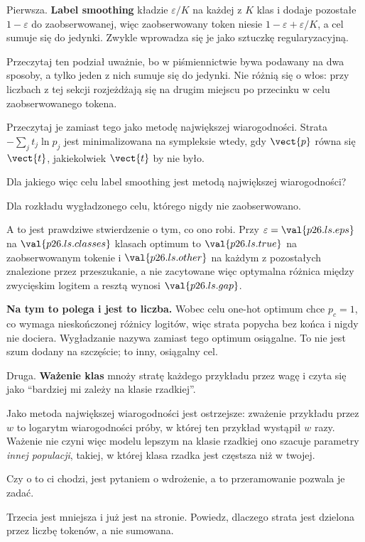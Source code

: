 \begin{fr}
Pierwsza. \textbf{Label smoothing} kładzie $\varepsilon/K$ na każdej z $K$
klas i dodaje pozostałe $1-\varepsilon$ do zaobserwowanej, więc zaobserwowany
token niesie $1 - \varepsilon + \varepsilon/K$, a cel sumuje się do jedynki.
Zwykle wprowadza się je jako sztuczkę regularyzacyjną.

Przeczytaj ten podział uważnie, bo w piśmiennictwie bywa podawany na dwa
sposoby, a tylko jeden z nich sumuje się do jedynki. Nie różnią się o włos:
przy liczbach z tej sekcji rozjeżdżają się na drugim miejscu po przecinku
w celu zaobserwowanego tokena.

Przeczytaj je zamiast tego jako metodę największej wiarogodności. Strata
$-\sum_j t_j \ln p_j$ jest minimalizowana na sympleksie wtedy, gdy $\vect{p}$
równa się $\vect{t}$, jakiekolwiek $\vect{t}$ by nie było.

Dla jakiego więc celu label smoothing jest metodą największej wiarogodności?
\dotline
\nextframe
\end{fr}

\begin{fr}
\begin{ansblock}
Dla rozkładu wygładzonego \dash{} celu, którego nigdy nie zaobserwowano.
\end{ansblock}

A to jest prawdziwe stwierdzenie o tym, co ono robi. Przy
$\varepsilon = \val{p26.ls.eps}$ na $\val{p26.ls.classes}$ klasach optimum to
$\val{p26.ls.true}$ na zaobserwowanym tokenie i $\val{p26.ls.other}$ na
każdym z pozostałych \dash{} znalezione przez przeszukanie, a nie zacytowane
\dash{} więc optymalna różnica między zwycięskim logitem a resztą wynosi
$\val{p26.ls.gap}$.

\textbf{Na tym to polega i jest to liczba.} Wobec celu one-hot optimum chce
$p_c = 1$, co wymaga nieskończonej różnicy logitów, więc strata popycha bez
końca i nigdy nie dociera. Wygładzanie nazywa zamiast tego optimum
osiągalne. To nie jest szum dodany na szczęście; to inny, osiągalny cel.
\end{fr}

\begin{fr}
Druga. \textbf{Ważenie klas} mnoży stratę każdego przykładu przez wagę i
czyta się jako \enquote{bardziej mi zależy na klasie rzadkiej}.

Jako metoda największej wiarogodności jest ostrzejsze: zważenie przykładu
przez $w$ to logarytm wiarogodności próby, w której ten przykład wystąpił $w$
razy. Ważenie nie czyni więc modelu lepszym na klasie rzadkiej \dash{} ono
szacuje parametry \emph{innej populacji}, takiej, w której klasa rzadka jest
częstsza niż w twojej.

Czy o to ci chodzi, jest pytaniem o wdrożenie, a to przeramowanie pozwala je
zadać.

Trzecia jest mniejsza i już jest na stronie. Powiedz, dlaczego strata jest
dzielona przez liczbę tokenów, a nie sumowana.
\dotline
\nextframe
\end{fr}

